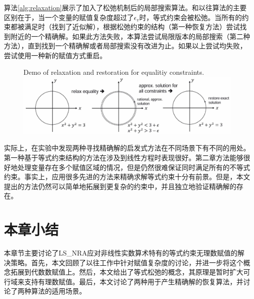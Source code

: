算法\ref{alg:relaxation}展示了加入了松弛机制后的局部搜索算法。和以往算法的主要区别在于，当一个变量的赋值复杂度超过了$\epsilon_v$时，等式约束会被松弛。当所有的约束都被满足时（找到了近似解），根据松弛约束的结构（第一种恢复方法）尝试找到附近的一个精确解。如果此方法失败，本算法尝试局限版本的局部搜索（第二种方法），直到找到一个精确解或者局部搜索没有改进为止。如果以上尝试均失败，尝试使用一种新的赋值方式重启。

\begin{figure}[t]
    \centering
     {Demo of relaxation and restoration for equalitiy constraints.}
    \includegraphics[width=\columnwidth]{Img/relax.jpg}
\label{fig:relaxation}
\end{figure}

实际上，在实验中发现两种寻找精确解的启发式方法在不同场景下有不同的用处。第一种基于等式约束结构的方法在涉及到线性方程时表现很好。第二章方法能够很好地处理变量存在多个赋值区域的情况，但是仍然很难保证同时满足所有的不等式约束。事实上，应用很多先进的方法来精确求解等式约束十分有前景\cite{CimattiGLS22, LiXZ23b}。但是，本文提出的方法仍然可以简单地拓展到更复杂的约束中，并且独立地验证精确解的存在。

\section{本章小结}
本章节主要讨论了LS\_NRA应对非线性实数算术特有的等式约束无理数赋值的解决策略。首先，本文回顾了以往工作中针对赋值复杂度的讨论，并进一步将这个概念拓展到代数数赋值上。然后，本文给出了等式松弛的概念，其原理是暂时扩大可行域来支持有理数赋值。最后，本文讨论了两种用于产生精确解的恢复算法，并讨论了两种算法的适用场景。

